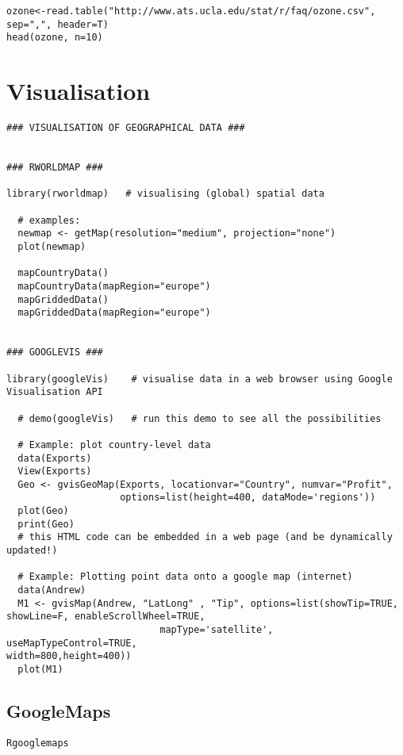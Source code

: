 \documentclass[11pt]{article} %
\begin{document}
\begin{framed}
\begin{verbatim}
ozone<-read.table("http://www.ats.ucla.edu/stat/r/faq/ozone.csv", sep=",", header=T)
head(ozone, n=10)
\end{verbatim}
\end{framed}
\newpage
\section{Visualisation}
\begin{verbatim} 
### VISUALISATION OF GEOGRAPHICAL DATA ###
 
 
### RWORLDMAP ###
 
library(rworldmap)   # visualising (global) spatial data
 
  # examples:
  newmap <- getMap(resolution="medium", projection="none")
  plot(newmap)
 
  mapCountryData()
  mapCountryData(mapRegion="europe")
  mapGriddedData()
  mapGriddedData(mapRegion="europe")
 
 
### GOOGLEVIS ###
 
library(googleVis)    # visualise data in a web browser using Google
Visualisation API
 
  # demo(googleVis)   # run this demo to see all the possibilities
 
  # Example: plot country-level data
  data(Exports)
  View(Exports)
  Geo <- gvisGeoMap(Exports, locationvar="Country", numvar="Profit",
                    options=list(height=400, dataMode='regions'))
  plot(Geo)
  print(Geo)
  # this HTML code can be embedded in a web page (and be dynamically updated!)
 
  # Example: Plotting point data onto a google map (internet)
  data(Andrew)
  M1 <- gvisMap(Andrew, "LatLong" , "Tip", options=list(showTip=TRUE,
showLine=F, enableScrollWheel=TRUE,
                           mapType='satellite', useMapTypeControl=TRUE,
width=800,height=400))
  plot(M1)
\end{verbatim}
 
\newpage
\subsection{GoogleMaps}

\texttt{Rgooglemaps}
\end{document}
